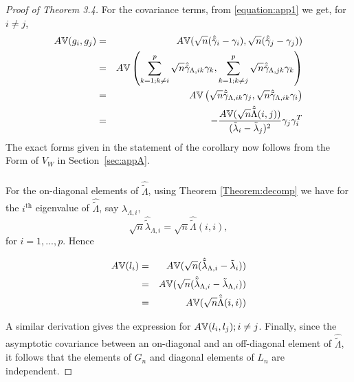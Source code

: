 \begin{proof}[Proof of Theorem 3.4]
For the covariance terms, from \eqref{equation:app1} we get, for $i \neq j$,
%
\begin{eqnarray*}
A{\mathbb{V}}(g_i, g_j) &=&
A{\mathbb{V}}(\sqrt n ( \hat{\tilde \gamma}_{i} - \gamma_i),
\sqrt n ( \hat{\tilde \gamma}_{j} - \gamma_j))\\
&=& A{\mathbb{V}} \left(
\sum_{k=1; k \neq i}^p \sqrt n \hat {\tilde \gamma}_{\Lambda,ik} \gamma_k,
\sum_{k=1; k \neq j}^p \sqrt n \hat {\tilde \gamma}_{\Lambda,jk} \gamma_k \right)\\
&=& A{\mathbb{V}} \left(
\sqrt n \hat {\tilde \gamma}_{\Lambda,ik} \gamma_j,
\sqrt n \hat {\tilde \gamma}_{\Lambda,ik} \gamma_i \right)\\
&=& - \frac{A{\mathbb{V}}(\sqrt n \hat {\tilde \Lambda} (i,j))}
{(\tilde \lambda_i - \tilde \lambda_j)^2} \gamma_j \gamma_i^T
\end{eqnarray*}
%
The exact forms given in the statement of the corollary now follows from the  Form of $V_W$ in Section~\ref{sec:appA}.

\paragraph{}For the on-diagonal elements of $\hat {\tilde \Lambda}$, using Theorem \ref{Theorem:decomp} we have for the $i^\text{th}$ eigenvalue of $\hat {\tilde \Lambda}$, say $\lambda_{\Lambda,i}$,
%
$$ \sqrt n \hat {\tilde \lambda}_{\Lambda,i} = \sqrt n \hat {\tilde \Lambda} (i,i), $$
%
for $i = 1,...,p$. Hence

\begin{eqnarray*}
A{\mathbb{V}}(l_i) &=& A{\mathbb{V}}( \sqrt n (\hat {\tilde \lambda}_{\Lambda,i} - \tilde \lambda_i) )\\
&=& A{\mathbb{V}}( \sqrt n (\hat {\tilde \lambda}_{\Lambda,i} - \tilde \lambda_{\Lambda,i}) )\\
&=& A{\mathbb{V}}(\sqrt n \hat {\tilde \Lambda} (i,i))
\end{eqnarray*}

A similar derivation gives the expression for $A{\mathbb{V}}(l_i,l_j); i \neq j$. Finally, since the asymptotic covariance between an on-diagonal and an off-diagonal element of $\hat {\tilde \Lambda}$, it follows that the elements of $G_n$ and diagonal elements of $L_n$ are independent.
\end{proof}